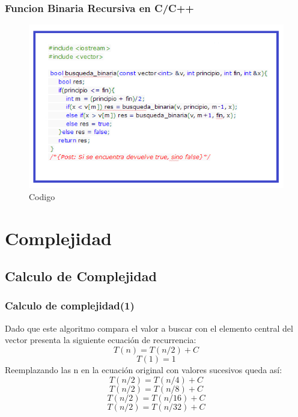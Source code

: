 \documentclass{beamer}
\begin{document}
		\begin{frame}
			\frametitle{Funcion Binaria Recursiva en C/C++}
			\begin{figure}
  				\centering
    			           \includegraphics[scale=0.6]{CodigoC.png}
  				\caption{Codigo}
  				\label{fig:lls}
			\end{figure}
			
		\end{frame}

		
\section{Complejidad}

	\subsection{Calculo de Complejidad}

		\begin{frame}
			\frametitle{Calculo de complejidad(1)}
			Dado que este algoritmo compara el valor a buscar con el elemento central del vector presenta la siguiente ecuación de recurrencia:
			\begin{equation}
					T(n) = T(n/2) + C
				\end{equation}
			\begin{equation}
					T(1) = 1
				\end{equation}
Reemplazando las n en la ecuación original con valores sucesivos queda así:
             \begin{equation}
					T(n/2) = T(n/4) + C
				\end{equation}
				  \begin{equation}
					T(n/2) = T(n/8) + C
				\end{equation}
				  \begin{equation}
					T(n/2) = T(n/16) + C
				\end{equation}
				  \begin{equation}
					T(n/2) = T(n/32) + C
				\end{equation}
		\end{frame}
\end{document}

